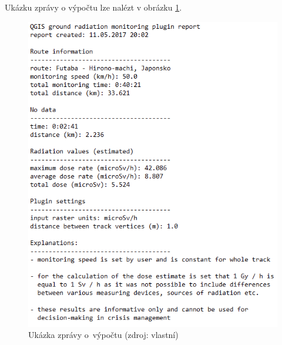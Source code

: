 \begin{enumerate}
\begin{itemize}
		\end{itemize}
Ukázku zprávy o výpočtu lze nalézt v obrázku \ref{fig:report}.	
			\begin{figure}[H] \centering
      			\includegraphics[scale=0.9]{./pictures/report.png}
      				\caption[Ukázka zprávy
o~výpočtu]{Ukázka zprávy o~výpočtu (zdroj: vlastní)}
     				\label{fig:report}
  			\end{figure}
  			

\end{enumerate}
